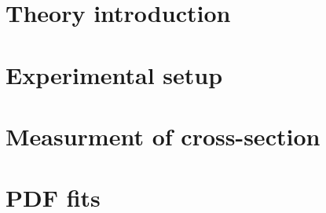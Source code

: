 \documentclass[11pt,notitlepage,twoside,BCOR=8.25mm,headsepline,numbers=noendperiod,DIV=14]{scrbook} %
\begin{document}


  \dominitoc[n]  

%


%




\linenumbers
  \mainmatter
  
  \part{Theory introduction}
  
  \part{Experimental setup}
  
  
  
  
  
  \part{Measurment of cross-section}
   
  
  
  
  
  
  
  \part{PDF fits}
  

%
%
%
%
%
%
%
%
%
\end{document}
